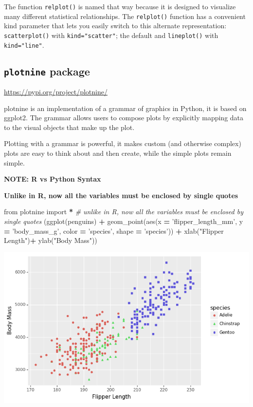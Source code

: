 \documentclass[]{book}
\newenvironment{Shaded}{\begin{snugshade}}{\end{snugshade}}
\newcommand{\CommentTok}[1]{\textcolor[rgb]{0.56,0.35,0.01}{\textit{#1}}}
\newcommand{\ImportTok}[1]{#1}
\newcommand{\NormalTok}[1]{#1}
\newcommand{\OperatorTok}[1]{\textcolor[rgb]{0.81,0.36,0.00}{\textbf{#1}}}
\newcommand{\StringTok}[1]{\textcolor[rgb]{0.31,0.60,0.02}{#1}}
\begin{document}
The function \texttt{relplot()} is named that way because it is designed to visualize many different statistical relationships. The \texttt{relplot()} function has a convenient kind parameter that lets you easily switch to this alternate representation:
\texttt{scatterplot()} with \texttt{kind="scatter"}; the default and \texttt{lineplot()} with \texttt{kind="line"}.

\hypertarget{plotnine-package}{%
\subsection{\texorpdfstring{\texttt{plotnine} package}{plotnine package}}\label{plotnine-package}}

\url{https://pypi.org/project/plotnine/}

plotnine is an implementation of a grammar of graphics in Python, it is based on ggplot2. The grammar allows users to compose plots by explicitly mapping data to the visual objects that make up the plot.

Plotting with a grammar is powerful, it makes custom (and otherwise complex) plots are easy to think about and then create, while the simple plots remain simple.

\textbf{NOTE: R vs Python Syntax}

\textbf{Unlike in R, now all the variables must be enclosed by single quotes}

\begin{Shaded}
\begin{Highlighting}[]
\ImportTok{from}\NormalTok{ plotnine }\ImportTok{import} \OperatorTok{*}
\CommentTok{# unlike in R, now all the variables must be enclosed by single quotes}
\NormalTok{(ggplot(penguins) }\OperatorTok{+}
\NormalTok{  geom_point(aes(x }\OperatorTok{=} \StringTok{'flipper_length_mm'}\NormalTok{,}
\NormalTok{                  y }\OperatorTok{=} \StringTok{'body_mass_g'}\NormalTok{,}
\NormalTok{                  color }\OperatorTok{=} \StringTok{'species'}\NormalTok{,}
\NormalTok{                  shape }\OperatorTok{=} \StringTok{'species'}\NormalTok{)) }\OperatorTok{+}
\NormalTok{  xlab(}\StringTok{"Flipper Length"}\NormalTok{)}\OperatorTok{+}
\NormalTok{  ylab(}\StringTok{"Body Mass"}\NormalTok{))}
\end{Highlighting}
\end{Shaded}

\begin{center}\includegraphics[width=0.9\linewidth]{fig/Viz_chap/3_plotnine} \end{center}
\end{document}

